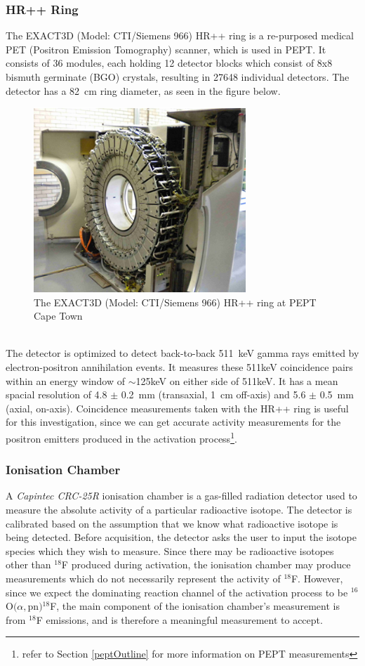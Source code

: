 \documentclass[]{article}
\begin{document}
\subsubsection{HR++ Ring}
The EXACT3D (Model: CTI/Siemens 966) HR++ ring\cite{peptSite} is a re-purposed medical PET (Positron Emission Tomography) scanner, which is used in PEPT. It consists of 36 modules, each holding 12 detector blocks which consist of 8x8 bismuth germinate (BGO) crystals, resulting in 27648 individual detectors. The detector has a \SI{82}{\centi \metre} ring diameter, as seen in the figure below.
\begin{figure}[h!]
	\includegraphics[width=8cm]{hr.png}
	\centering
	\caption{The EXACT3D (Model: CTI/Siemens 966) HR++ ring at PEPT Cape Town}
	\label{fig:HR_ring}
\end{figure}~\\
The detector is optimized to detect back-to-back \SI{511}{\kilo \electronvolt} gamma rays emitted by electron-positron annihilation events. It measures these 511keV coincidence pairs within an energy window of $\sim$125keV on either side of 511keV. It has a mean spacial resolution of 4.8 $\pm$ 0.2\SI{}{\milli \metre} (transaxial, \SI{1}{\centi \metre} off-axis) and 5.6 $\pm$ 0.5\SI{}{\milli \metre} (axial, on-axis). Coincidence measurements taken with the HR++ ring is useful for this investigation, since we can get accurate activity measurements for the positron emitters produced in the activation process\footnote{refer to Section \ref{peptOutline} for more information on PEPT measurements}.    

\subsubsection{Ionisation Chamber}\label{ionisationchamber}
A \textit{Capintec CRC-25R} ionisation chamber is a gas-filled radiation detector used to measure the absolute activity of a particular radioactive isotope. The detector is calibrated based on the assumption that we know what radioactive isotope is being detected. Before acquisition, the detector asks the user to input the isotope species which they wish to measure. Since there may be radioactive isotopes other than ${}^{18}$F produced during activation, the ionisation chamber may produce measurements which do not necessarily represent the activity of ${}^{18}$F. However, since we expect the dominating reaction channel of the activation process to be ${}^{16}$O$(\alpha,$pn$){}^{18}$F, the main component of the ionisation chamber's measurement is from ${}^{18}$F emissions, and is therefore a meaningful measurement to accept.
\end{document}
